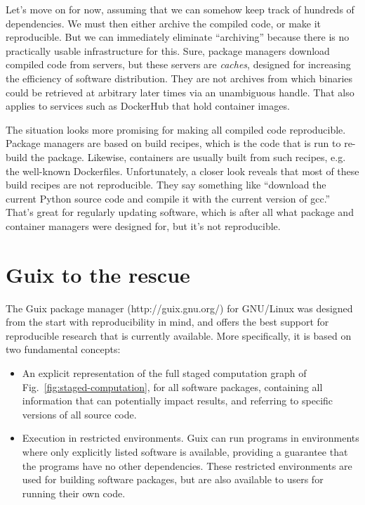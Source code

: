 \documentclass[10pt,journal,compsoc]{IEEEtran}
\begin{document}
Let's move on for now, assuming that we can somehow keep track of hundreds of dependencies. We must then either archive the compiled code, or make it reproducible. But we can immediately eliminate ``archiving'' because there is no practically usable infrastructure for this. Sure, package managers download compiled code from servers, but these servers are \textit{caches}, designed for increasing the efficiency of software distribution. They are not archives from which binaries could be retrieved at arbitrary later times via an unambiguous handle. That also applies to services such as DockerHub that hold container images.

The situation looks more promising for making all compiled code reproducible. Package managers are based on build recipes, which is the code that is run to re-build the package. Likewise, containers are usually built from such recipes, e.g. the well-known Dockerfiles. Unfortunately, a closer look reveals that most of these build recipes are not reproducible. They say something like ``download the current Python source code and compile it with the current version of gcc.'' That's great for regularly updating software, which is after all what package and container managers were designed for, but it's not reproducible.

\section{Guix to the rescue}

The Guix package manager (http://guix.gnu.org/) for GNU/Linux was designed from the start with reproducibility in mind, and offers the best support for reproducible research that is currently available. More specifically, it is based on two fundamental concepts:
\begin{itemize}
\item An explicit representation of the full staged computation graph of Fig.~\ref{fig:staged-computation}, for all software packages, containing all information that can potentially impact results, and referring to specific versions of all source code.
\item Execution in restricted environments. Guix can run programs in environments where only explicitly listed software is available, providing a guarantee that the programs have no other dependencies. These restricted environments are used for building software packages, but are also available to users for running their own code.
\end{itemize}
\end{document}
